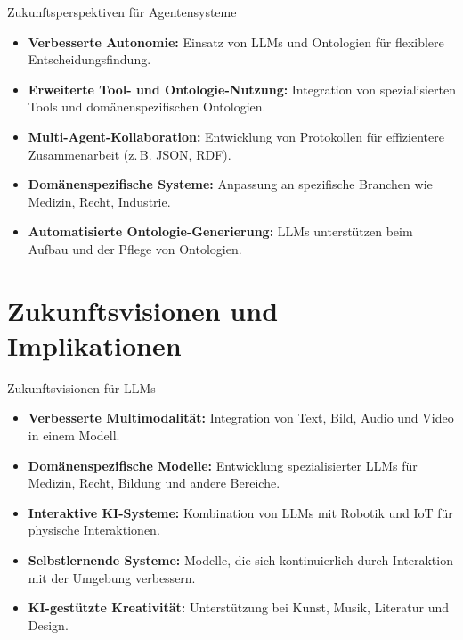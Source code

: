 \documentclass[aspectratio=1610, xcolor=dvipsnames, 9pt]{beamer}
\begin{document}
\begin{frame}{Zukunftsperspektiven für Agentensysteme}
  \begin{itemize}
    \item \textbf{Verbesserte Autonomie:} Einsatz von LLMs und Ontologien für flexiblere Entscheidungsfindung.
    \item \textbf{Erweiterte Tool- und Ontologie-Nutzung:} Integration von spezialisierten Tools und domänenspezifischen Ontologien.
    \item \textbf{Multi-Agent-Kollaboration:} Entwicklung von Protokollen für effizientere Zusammenarbeit (z. B. JSON, RDF).
    \item \textbf{Domänenspezifische Systeme:} Anpassung an spezifische Branchen wie Medizin, Recht, Industrie.
    \item \textbf{Automatisierte Ontologie-Generierung:} LLMs unterstützen beim Aufbau und der Pflege von Ontologien.
  \end{itemize}
\end{frame}

\section{Zukunftsvisionen und Implikationen}

\begin{frame}{Zukunftsvisionen für LLMs}
  \begin{itemize}
    \item \textbf{Verbesserte Multimodalität:} Integration von Text, Bild, Audio und Video in einem Modell. \\
    \item \textbf{Domänenspezifische Modelle:} Entwicklung spezialisierter LLMs für Medizin, Recht, Bildung und andere Bereiche. \\
    \item \textbf{Interaktive KI-Systeme:} Kombination von LLMs mit Robotik und IoT für physische Interaktionen.\\
    \item \textbf{Selbstlernende Systeme:} Modelle, die sich kontinuierlich durch Interaktion mit der Umgebung verbessern.\\
    \item \textbf{KI-gestützte Kreativität:} Unterstützung bei Kunst, Musik, Literatur und Design.
  \end{itemize}
\end{frame}
\end{document}
